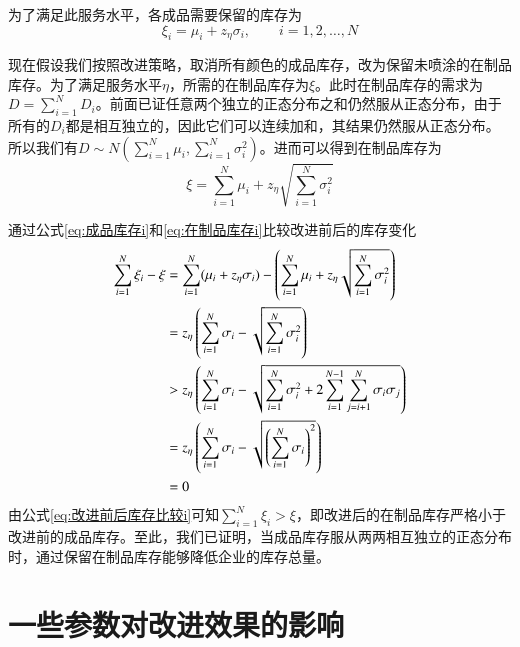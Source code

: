 为了满足此服务水平，各成品需要保留的库存为
\begin{equation}
\xi_i = \mu_i + z_\eta\sigma_i,\qquad i=1,2,\ldots,N
\label{eq:成品库存i}
\end{equation}

现在假设我们按照改进策略，取消所有颜色的成品库存，改为保留未喷涂的在制品库存。为了满足服务水平$\eta$，所需的在制品库存为$\xi$。此时在制品库存的需求为$D=\sum_{i=1}^ND_i$。前面已证任意两个独立的正态分布之和仍然服从正态分布，由于所有的$D_i$都是相互独立的，因此它们可以连续加和，其结果仍然服从正态分布。所以我们有$D\sim N(\sum_{i=1}^N\mu_i,\sum_{i=1}^N\sigma_i^2)$。进而可以得到在制品库存为
\begin{equation}
\xi = \sum_{i=1}^N\mu_i + z_\eta\sqrt{\sum_{i=1}^N\sigma_i^2}
\label{eq:在制品库存i}
\end{equation}

通过公式\ref{eq:成品库存i}和\ref{eq:在制品库存i}比较改进前后的库存变化
\begin{align}
\sum_{i=1}^N\xi_i - \xi &= \sum_{i=1}^N (\mu_i+z_\eta\sigma_i) - \left(\sum_{i=1}^N\mu_i + z_\eta\sqrt{\sum_{i=1}^N\sigma_i^2}\right) \notag\\
&= z_\eta\left(\sum_{i=1}^N\sigma_i-\sqrt{\sum_{i=1}^N\sigma_i^2}\right) \notag\\
&> z_\eta\left(\sum_{i=1}^N\sigma_i-\sqrt{\sum_{i=1}^N\sigma_i^2+2\sum_{i=1}^{N-1}\sum_{j=i+1}^N\sigma_i\sigma_j}\right) \notag\\
&= z_\eta\left(\sum_{i=1}^N\sigma_i-\sqrt{\left(\sum_{i=1}^N\sigma_i\right)^2}\right) \notag\\
&= 0
\label{eq:改进前后库存比较i}
\end{align}
由公式\ref{eq:改进前后库存比较i}可知$\sum_{i=1}^N\xi_i > \xi$，即改进后的在制品库存严格小于改进前的成品库存。至此，我们已证明，当成品库存服从两两相互独立的正态分布时，通过保留在制品库存能够降低企业的库存总量。





\section{一些参数对改进效果的影响}















